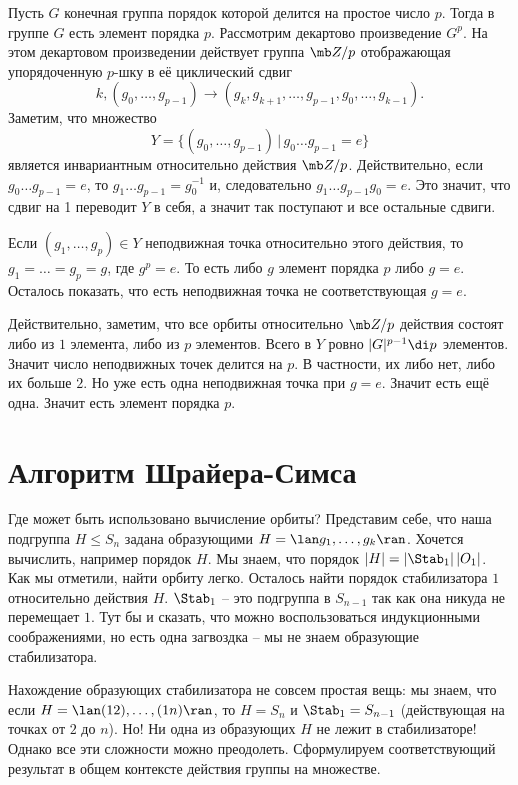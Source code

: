 \thrm[Коши] Пусть $G$ конечная группа порядок которой делится на простое число $p$. Тогда в группе $G$ есть элемент порядка $p$.
\ethrm
\proof Рассмотрим декартово произведение $G^p$. На этом декартовом произведении действует группа $\mb Z/p$ отображающая упорядоченную $p$-шку в её циклический сдвиг 
$$k,(g_0,\dots,g_{p-1})\to (g_k,g_{k+1},\dots,g_{p-1},g_0,\dots,g_{k-1}).$$
Заметим, что множество $$Y=\{(g_0,\dots,g_{p-1})\,|\, g_0\dots g_{p-1}=e\}$$
является инвариантным относительно действия $\mb Z/p$. Действительно, если $g_0\dots g_{p-1}=e$, то $g_1\dots g_{p-1}=g_0^{-1}$ и, следовательно $g_1\dots g_{p-1} g_0=e$. Это значит, что сдвиг на 1 переводит $Y$ в себя, а значит так поступают и все остальные сдвиги.

Если $(g_1,\dots,g_p)\in Y$ неподвижная точка относительно этого действия, то $g_1=\dots=g_p=g$, где $g^p=e$. То есть либо $g$ элемент порядка $p$ либо $g=e$. Осталось показать, что есть неподвижная точка не соответствующая $g=e$.

Действительно, заметим, что все орбиты относительно $\mb Z/p$ действия состоят либо из $1$ элемента, либо из $p$ элементов. Всего в $Y$ ровно $|G|^{p-1}\di p$ элементов. Значит число неподвижных точек делится на $p$. В частности, их либо нет, либо их больше $2$. Но уже есть одна неподвижная точка при $g=e$. Значит есть ещё одна. Значит есть  элемент порядка $p$.
\endproof


\section{Алгоритм Шрайера-Симса}

Где может быть использовано вычисление орбиты? Представим себе, что наша подгруппа $H \leq S_n$ задана образующими $H=\lan g_1,\dots,g_k\ran$. Хочется вычислить, например порядок $H$. Мы знаем, что порядок $|H|=|\Stab_1|\,|O_1|$. Как мы отметили, найти орбиту легко. Осталось найти порядок стабилизатора $1$ относительно действия $H$. $\Stab_1$ -- это подгруппа в $S_{n-1}$ так как она никуда не перемещает $1$. Тут бы и сказать, что можно воспользоваться индукционными соображениями, но есть одна загвоздка -- мы не знаем образующие стабилизатора.

Нахождение образующих стабилизатора не совсем простая вещь: мы знаем, что если $H=\lan (12),\dots,(1n)\ran$, то $H=S_n$ и $\Stab_1=S_{n-1}$ (действующая на точках от $2$ до $n$). Но! Ни одна из образующих $H$ не лежит в стабилизаторе! Однако все эти сложности можно преодолеть. Сформулируем соответствующий результат  в общем контексте действия группы на множестве.

